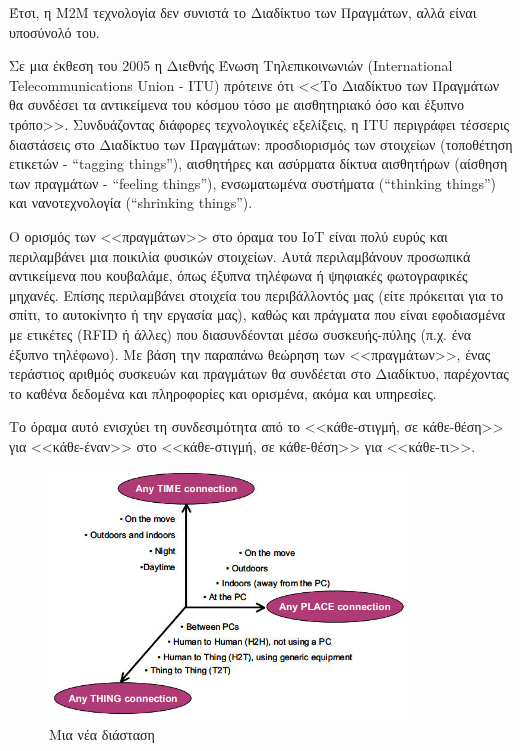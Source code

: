 \documentclass[12pt, a4paper, oneside]{report}
\begin{document}
Έτσι, η Μ2Μ τεχνολογία δεν συνιστά το Διαδίκτυο των Πραγμάτων, αλλά είναι υποσύνολό του.

Σε μια έκθεση του 2005 η Διεθνής Ένωση Τηλεπικοινωνιών (\textenglish{International Telecommunications Union - ITU}) πρότεινε ότι <<Το Διαδίκτυο των Πραγμάτων θα συνδέσει τα αντικείμενα του κόσμου τόσο με αισθητηριακό όσο και έξυπνο τρόπο>>. Συνδυάζοντας διάφορες τεχνολογικές εξελίξεις, η ITU περιγράφει τέσσερις διαστάσεις στο Διαδίκτυο των Πραγμάτων: προσδιορισμός των στοιχείων (τοποθέτηση ετικετών - ``tagging things''), αισθητήρες και ασύρματα δίκτυα αισθητήρων (αίσθηση των πραγμάτων - ``feeling things''), ενσωματωμένα συστήματα (``thinking things'') και νανοτεχνολογία (``shrinking things'').

Ο ορισμός των <<πραγμάτων>> στο όραμα του ΙοΤ είναι πολύ ευρύς και περιλαμβάνει μια ποικιλία φυσικών στοιχείων. Αυτά περιλαμβάνουν προσωπικά αντικείμενα που κουβαλάμε, όπως έξυπνα τηλέφωνα ή ψηφιακές φωτογραφικές μηχανές. Επίσης περιλαμβάνει στοιχεία του περιβάλλοντός μας (είτε πρόκειται για το σπίτι, το αυτοκίνητο ή την εργασία μας), καθώς και πράγματα που είναι εφοδιασμένα με ετικέτες (RFID ή άλλες) που διασυνδέονται μέσω συσκευής-πύλης (π.χ. ένα έξυπνο τηλέφωνο). Με βάση την παραπάνω θεώρηση των <<πραγμάτων>>, ένας τεράστιος αριθμός συσκευών και πραγμάτων θα συνδέεται στο Διαδίκτυο, παρέχοντας το καθένα δεδομένα και πληροφορίες και ορισμένα, ακόμα και υπηρεσίες.

Το όραμα αυτό ενισχύει τη συνδεσιμότητα από το <<κάθε-στιγμή, σε κάθε-θέση>> για <<κάθε-έναν>> στο <<κάθε-στιγμή, σε κάθε-θέση>> για <<κάθε-τι>>.
\clearpage
\begin{figure}[t]
\centering
\includegraphics[width=0.85\textwidth]{eikona_07}
\caption[Μια νέα διάσταση]{Μια νέα διάσταση\cite{iot}}
\end{figure}
\end{document}
